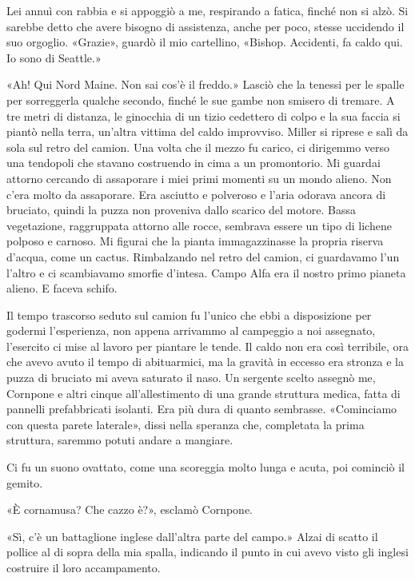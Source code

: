 Lei annuì con rabbia e si appoggiò a me, respirando a fatica, finché non
si alzò. Si sarebbe detto che avere bisogno di assistenza, anche per
poco, stesse uccidendo il suo orgoglio. «Grazie», guardò il mio
cartellino, «Bishop. Accidenti, fa caldo qui. Io sono di Seattle.»

«Ah! Qui Nord Maine. Non sai cos'è il freddo.» Lasciò che la tenessi per
le spalle per sorreggerla qualche secondo, finché le sue gambe non
smisero di tremare. A tre metri di distanza, le ginocchia di un tizio
cedettero di colpo e la sua faccia si piantò nella terra, un'altra
vittima del caldo improvviso. Miller si riprese e salì da sola sul retro
del camion. Una volta che il mezzo fu carico, ci dirigemmo verso una
tendopoli che stavano costruendo in cima a un promontorio. Mi guardai
attorno cercando di assaporare i miei primi momenti su un mondo alieno.
Non c'era molto da assaporare. Era asciutto e polveroso e l'aria odorava
ancora di bruciato, quindi la puzza non proveniva dallo scarico del
motore. Bassa vegetazione, raggruppata attorno alle rocce, sembrava
essere un tipo di lichene polposo e carnoso. Mi figurai che la pianta
immagazzinasse la propria riserva d'acqua, come un cactus. Rimbalzando
nel retro del camion, ci guardavamo l'un l'altro e ci scambiavamo
smorfie d'intesa. Campo Alfa era il nostro primo pianeta alieno. E
faceva schifo.

\hfill\break

Il tempo trascorso seduto sul camion fu l'unico che ebbi a disposizione
per godermi l'esperienza, non appena arrivammo al campeggio a noi
assegnato, l'esercito ci mise al lavoro per piantare le tende. Il caldo
non era così terribile, ora che avevo avuto il tempo di abituarmici, ma
la gravità in eccesso era stronza e la puzza di bruciato mi aveva
saturato il naso. Un sergente scelto assegnò me, Cornpone e altri cinque
all'allestimento di una grande struttura medica, fatta di pannelli
prefabbricati isolanti. Era più dura di quanto sembrasse. «Cominciamo
con questa parete laterale», dissi nella speranza che, completata la
prima struttura, saremmo potuti andare a mangiare.

Ci fu un suono ovattato, come una scoreggia molto lunga e acuta, poi
cominciò il gemito.

«È cornamusa? Che cazzo è?», esclamò Cornpone.

«Sì, c'è un battaglione inglese dall'altra parte del campo.» Alzai di
scatto il pollice al di sopra della mia spalla, indicando il punto in
cui avevo visto gli inglesi costruire il loro accampamento.

